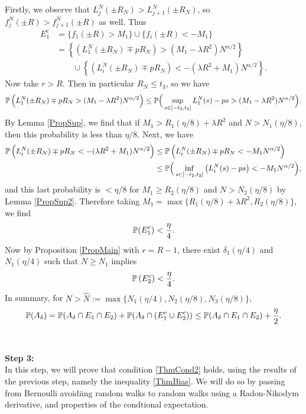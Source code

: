 	Firstly, we observe that $L_j^N(\pm R_N)> L_{j+1}^N(\pm R_N)$, so $f_j^N(\pm R)>f_{j+1}^N(\pm R)$ as well. Thus
	\begin{align*}
	E_1^c &= \{f_1(\pm R)> M_1\} \cup \{f_i(\pm R)<-M_1\} \\
	&= \left\{ \left(L_1^N(\pm R_N)\mp pR_N\right)> (M_1-\lambda R^2)N^{\alpha/2}\right\}\\
	&\qquad \cup \left\{\left(L_i^N(\pm R_N)\mp pR_N\right)< -(\lambda R^2+M_1)N^{\alpha/2}\right\}.
	\end{align*}
	Now take $r>R$. Then in particular $R_N \leq t_3$, so we have $$
	\mathbb{P}\left(L_1^N(\pm R_N)\mp pR_N>(M_1-\lambda R^2)N^{\alpha/2}\right)
	\leq\mathbb{P}\Big(\sup_{s\in[-t_3,t_3]}L_1^N(s)-ps>(M_1-\lambda R^2)N^{\alpha/2}\Big).
	$$ By Lemma \ref{PropSup}, we find that if $M_1>R_1(\eta/8)+\lambda R^2$ and $N>N_1(\eta/8)$, then this probability is less than $\eta/8$. Next, we have
	\begin{align*}
	\mathbb{P} \left(L_i^N(\pm R_N)\mp pR_N< -(\lambda R^2+M_1)N^{\alpha/2}\right)&\leq \mathbb{P} \left(L_i^N(\pm R_N)\mp pR_N< -M_1N^{\alpha/2}\right)\\
	&\leq \mathbb{P}\Big(\inf_{s\in[-t_2,t_2]}\big(L_i^N(s)-ps\big)<-M_1N^{\alpha/2}\Big),
	\end{align*}
	and this last probability is $<\eta/8$ for $M_1\geq R_2(\eta/8)$ and $N>N_2(\eta/8)$ by Lemma \ref{PropSup2}. Therefore taking $M_1=\max\{R_1(\eta/8)+\lambda R^2,R_2(\eta/8)\}$, we find $$\mathbb{P}(E_1^c)<\frac{\eta}{4}.$$
	Now by Proposition \ref{PropMain} with $r=R-1$, there exist $\delta_1(\eta/4)$ and $N_1(\eta/4)$ such that $N\geq N_1$ implies 
	\[
	\mathbb{P}\left( E_2^c\right)<\frac{\eta}{4}.
	\]
	In summary, for $N>\hat N:= \max\{N_1(\eta/4),N_2(\eta/8),N_3(\eta/8)\}$, 
	\begin{equation}
	\mathbb{P}(A_\delta)= \mathbb{P}(A_\delta\cap E_1\cap E_2)+\mathbb{P}(A_\delta\cap\left(E_1^c\cup E_2^c\right))\leq \mathbb{P}(A_\delta\cap E_1\cap E_2)+\frac{\eta}{2}. \label{ThmBias}
	\end{equation}
	\\\\\noindent\textbf{Step 3:}\\  In this step, we will prove that condition \ref{ThmCond2} holds, using the results of the previous step, namely the inequality \ref{ThmBias}. We will do so by passing from Bernoulli avoidiing random walks to random walks using a Radon-Nikodym derivative, and properties of the condtional expectation. 
	
